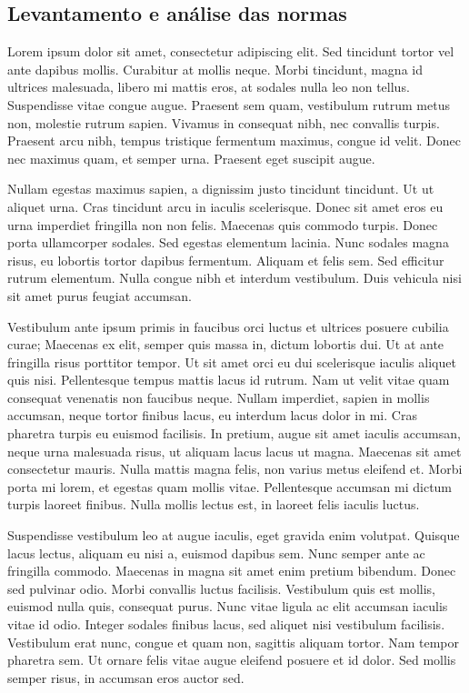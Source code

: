 \documentclass[12pt,a4paper]{article}
\begin{document}
\subsection{Levantamento e análise das normas}

Lorem ipsum dolor sit amet, consectetur adipiscing elit. Sed tincidunt tortor vel ante dapibus mollis. Curabitur at mollis neque. Morbi tincidunt, magna id ultrices malesuada, libero mi mattis eros, at sodales nulla leo non tellus. Suspendisse vitae congue augue. Praesent sem quam, vestibulum rutrum metus non, molestie rutrum sapien. Vivamus in consequat nibh, nec convallis turpis. Praesent arcu nibh, tempus tristique fermentum maximus, congue id velit. Donec nec maximus quam, et semper urna. Praesent eget suscipit augue.

Nullam egestas maximus sapien, a dignissim justo tincidunt tincidunt. Ut ut aliquet urna. Cras tincidunt arcu in iaculis scelerisque. Donec sit amet eros eu urna imperdiet fringilla non non felis. Maecenas quis commodo turpis. Donec porta ullamcorper sodales. Sed egestas elementum lacinia. Nunc sodales magna risus, eu lobortis tortor dapibus fermentum. Aliquam et felis sem. Sed efficitur rutrum elementum. Nulla congue nibh et interdum vestibulum. Duis vehicula nisi sit amet purus feugiat accumsan.

Vestibulum ante ipsum primis in faucibus orci luctus et ultrices posuere cubilia curae; Maecenas ex elit, semper quis massa in, dictum lobortis dui. Ut at ante fringilla risus porttitor tempor. Ut sit amet orci eu dui scelerisque iaculis aliquet quis nisi. Pellentesque tempus mattis lacus id rutrum. Nam ut velit vitae quam consequat venenatis non faucibus neque. Nullam imperdiet, sapien in mollis accumsan, neque tortor finibus lacus, eu interdum lacus dolor in mi. Cras pharetra turpis eu euismod facilisis. In pretium, augue sit amet iaculis accumsan, neque urna malesuada risus, ut aliquam lacus lacus ut magna. Maecenas sit amet consectetur mauris. Nulla mattis magna felis, non varius metus eleifend et. Morbi porta mi lorem, et egestas quam mollis vitae. Pellentesque accumsan mi dictum turpis laoreet finibus. Nulla mollis lectus est, in laoreet felis iaculis luctus.

Suspendisse vestibulum leo at augue iaculis, eget gravida enim volutpat. Quisque lacus lectus, aliquam eu nisi a, euismod dapibus sem. Nunc semper ante ac fringilla commodo. Maecenas in magna sit amet enim pretium bibendum. Donec sed pulvinar odio. Morbi convallis luctus facilisis. Vestibulum quis est mollis, euismod nulla quis, consequat purus. Nunc vitae ligula ac elit accumsan iaculis vitae id odio. Integer sodales finibus lacus, sed aliquet nisi vestibulum facilisis. Vestibulum erat nunc, congue et quam non, sagittis aliquam tortor. Nam tempor pharetra sem. Ut ornare felis vitae augue eleifend posuere et id dolor. Sed mollis semper risus, in accumsan eros auctor sed.
\end{document}
